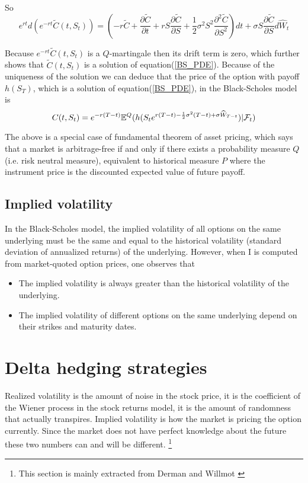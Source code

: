 \documentclass[10pt]{article}
\theoremstyle{plain}
\numberwithin{equation}{section}
\numberwithin{table}{section}
\newcommand{\s}{\sigma}
\newcommand{\prt}[1]{\left( #1 \right)}  %
\newcommand{\pa}{\partial}
\newcommand{\E}{\mathbb{E}}
\begin{document}
So 
\[
    e^{rt}d\prt{e^{-rt}\tilde C(t,S_t)} =  \prt{-r \tilde C+\frac{\pa \tilde C}{\pa t}+rS\frac{\pa \tilde C}{\pa S}+\frac{1}{2}\s^2 S^2 \frac{\pa^2 \tilde C}{\pa S^2}}dt + \s S\frac{\pa \tilde C}{\pa S} d \widehat{W}_t   
\]

Because $e^{-rt} \tilde{C}(t,S_t)$ is a $Q$-martingale then its drift term is zero, which further shows that $\tilde C(t,S_t)$ is a solution of equation(\ref{BS_PDE}). Because of the uniqueness of the solution we can deduce that 
the price of the option with payoff $h(S_T)$, which is a solution of equation(\ref{BS_PDE}),  in the Black-Scholes model is 
\[
    C(t,S_t) = e^{-r(T-t)}\E^Q(h(S_t e^{r(T-t)-\frac{1}{2}\s^2 (T-t)+\s \widehat{W}_{T-t}})|{\cal{F}}_t)    
\]


The above is a special case of fundamental theorem of asset pricing, which says that a market is arbitrage-free if and only if there exists a probability measure $Q$(i.e. risk neutral measure), equivalent to historical measure $P$ where the instrument price 
is the discounted expected value of future payoff.  


\subsection{Implied volatility}

In the Black-Scholes model, the implied volatility of all options on the same
underlying must be the same and equal to the historical volatility (standard
deviation of annualized returns) of the underlying. However, when I is computed
from market-quoted option prices, one observes that
\begin{itemize}
    \item The implied volatility is always greater than the historical volatility of the
    underlying.
    \item The implied volatility of different options on the same underlying depend
    on their strikes and maturity dates.
\end{itemize}


\section{Delta hedging strategies}
Realized volatility is the amount of noise in the stock price, it is the coefficient
of the Wiener process in the stock returns model, it is the amount of randomness that actually transpires. Implied volatility is how the
market is pricing the option currently. Since the market does not have
perfect knowledge about the future these two numbers can and will be
different. \footnote{This section is mainly extracted from Derman \cite{Derman} and Willmot \cite{Wilmott}}
\end{document}
